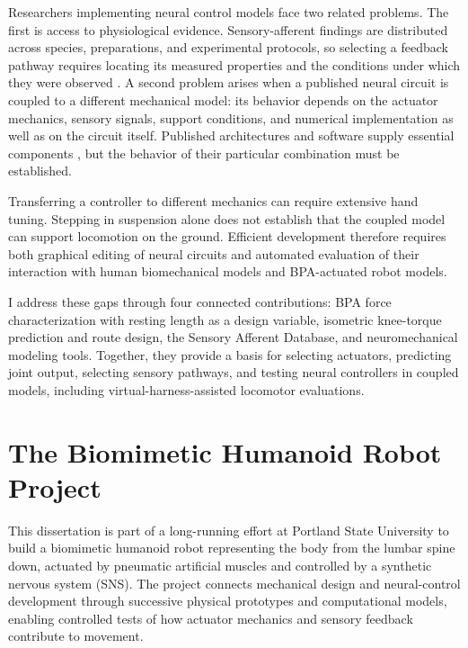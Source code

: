 Researchers implementing neural control models face two related problems. The first is access to physiological evidence. Sensory-afferent findings are distributed across species, preparations, and experimental protocols, so selecting a feedback pathway requires locating its measured properties and the conditions under which they were observed \citep{van_de_crommert_review_1998, windhorst_muscle_2007, windhorst_spinal_2022}. A second problem arises when a published neural circuit is coupled to a different mechanical model: its behavior depends on the actuator mechanics, sensory signals, support conditions, and numerical implementation as well as on the circuit itself. Published architectures and software supply essential components \citep{rybak_modelling_2006, mccrea_organization_2008, markin_afferent_2010, nourse_sns_2023}, but the behavior of their particular combination must be established.

Transferring a controller to different mechanics can require extensive hand tuning. Stepping in suspension alone does not establish that the coupled model can support locomotion on the ground. Efficient development therefore requires both graphical editing of neural circuits and automated evaluation of their interaction with human biomechanical models and BPA-actuated robot models.

I address these gaps through four connected contributions: BPA force characterization with resting length as a design variable, isometric knee-torque prediction and route design, the Sensory Afferent Database, and neuromechanical modeling tools. Together, they provide a basis for selecting actuators, predicting joint output, selecting sensory pathways, and testing neural controllers in coupled models, including virtual-harness-assisted locomotor evaluations.

\section{The Biomimetic Humanoid Robot Project}\label{sec:project}

This dissertation is part of a long-running effort at Portland State University to build a biomimetic humanoid robot representing the body from the lumbar spine down, actuated by pneumatic artificial muscles and controlled by a synthetic nervous system (SNS). The project connects mechanical design and neural-control development through successive physical prototypes and computational models, enabling controlled tests of how actuator mechanics and sensory feedback contribute to movement.

